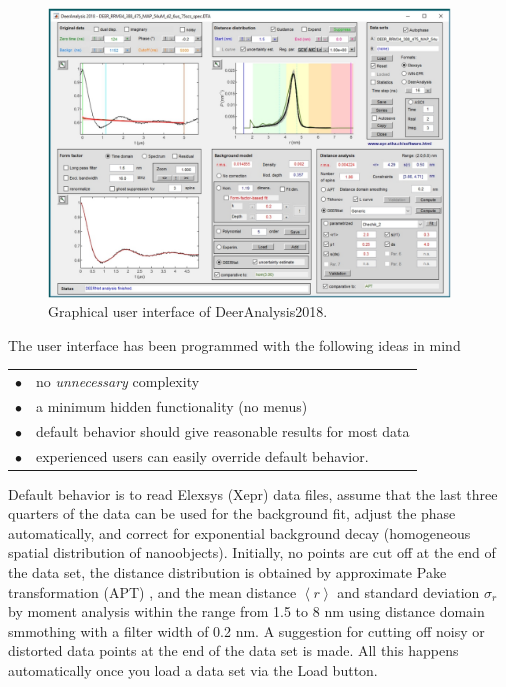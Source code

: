 \documentclass{article}
\begin{document}
\begin{figure}[ht]
 	\begin{center}
  \includegraphics[width=0.95\textwidth]{fig1.pdf}
	\end{center}
	\caption{Graphical user interface of DeerAnalysis2018.}
	\label{fig:manfig1}
\end{figure}

The user interface has been programmed with the following ideas in mind

\begin{tabular}{ll}
\noalign{\smallskip}
$\bullet$ & no {\em unnecessary} complexity \\
$\bullet$ & a minimum hidden functionality (no menus) \\
$\bullet$ & default behavior should give reasonable results for most data \\
$\bullet$ & experienced users can easily override default behavior. \\
\end{tabular}


Default behavior is to read Elexsys (Xepr) data files, assume that the last three quarters of the data can be used for the background fit, adjust the phase automatically, and correct for exponential background decay (homogeneous spatial distribution of nanoobjects). Initially, no points are cut off at the end of the data set, the distance distribution is obtained by approximate Pake transformation (APT) \cite{jeschke2001}, and the mean distance $\left\langle r \right\rangle$ and standard deviation $\sigma_{r}$ by moment analysis within the range from 1.5 to 8 nm using distance domain smmothing with a filter width of 0.2 nm. A suggestion for cutting off noisy or distorted data points at the end of the data set is made. All this happens automatically once you load a data set via the {\ttfamily Load} button.
\end{document}
